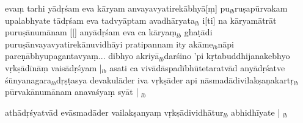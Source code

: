 \documentclass[article,12pt,a4paper]{memoir}%
\newcounter{parCount}
\begin{document}
	  
	  \pstart \leavevmode%
	evaṃ tarhi yādṛśam eva kāryam anvayavyatirekābhyā[ṃ] pu{\tiny $_{lb}$}ruṣapūrvakam upalabhyate tādṛśam eva tadvyāptam avadhāryata{\tiny $_{lb}$} \leavevmode{} i[ti] na kāryamātrāt puruṣānumānam [|] anyādṛśam eva ca kāryaṃ{\tiny $_{lb}$} ghaṭādi puruṣānvayavyatirekānuvidhāyi pratipannam ity akāme{\tiny $_{lb}$}nāpi pareṇābhyupagantavyaṃ... \leavevmode{}dibhyo akriyā{\tiny $_{lb}$}darśino 'pi kṛtabuddhijanakebhyo vṛkṣādīnāṃ vaisādṛśyam |{\tiny $_{lb}$} asati ca vivādāspadībhūtetaratvād anyādṛśatve śūnyanagara{\tiny $_{lb}$}dṛṣṭasya devakulāder iva vṛkṣāder api nāsmadādivilakṣaṇakartṛ{\tiny $_{lb}$}pūrvakānumānam anavaśyaṃ syāt |
	{}
	\pend%
      {\tiny $_{lb}$}

	  
	  \pstart \leavevmode%
	athādṛśyatvād evāsmadāder vailakṣanyaṃ vṛkṣādividhātur{\tiny $_{lb}$} abhidhīyate |
	{}
	\pend%
      {\tiny $_{lb}$}
\end{document}
